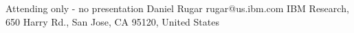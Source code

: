 \begin{conf-abstract}[]
{Attending only - no presentation}
{\color{blue} Daniel Rugar}
{rugar@us.ibm.com}
{IBM Research, 650 Harry Rd., San Jose, CA 95120, United States}
{\decofourleft \decofourright}





\printbibliography[heading=none]

\end{conf-abstract}
